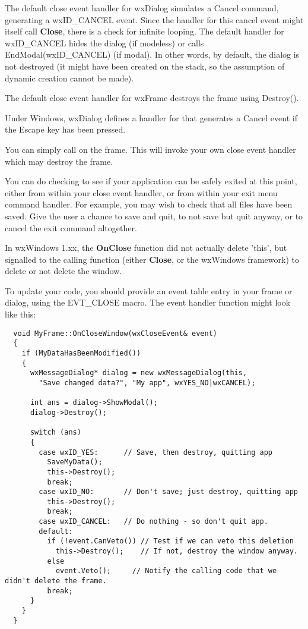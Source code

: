 
The default close event handler for wxDialog simulates a Cancel command,
generating a wxID\_CANCEL event. Since the handler for this cancel event might
itself call {\bf Close}, there is a check for infinite looping. The default handler
for wxID\_CANCEL hides the dialog (if modeless) or calls EndModal(wxID\_CANCEL) (if modal).
In other words, by default, the dialog is not destroyed (it might have been created
on the stack, so the assumption of dynamic creation cannot be made).

The default close event handler for wxFrame destroys the frame using Destroy().

Under Windows, wxDialog defines a handler for  that
generates a Cancel event if the Escape key has been pressed.


You can simply call  on the frame. This
will invoke your own close event handler which may destroy the frame.

You can do checking to see if your application can be safely exited at this point,
either from within your close event handler, or from within your exit menu command
handler. For example, you may wish to check that all files have been saved.
Give the user a chance to save and quit, to not save but quit anyway, or to cancel
the exit command altogether.


In wxWindows 1.xx, the {\bf OnClose} function did not actually delete 'this', but signalled
to the calling function (either {\bf Close}, or the wxWindows framework) to delete
or not delete the window.

To update your code, you should provide an event table entry in your frame or
dialog, using the EVT\_CLOSE macro. The event handler function might look like this:

{\small%
\begin{verbatim}
  void MyFrame::OnCloseWindow(wxCloseEvent& event)
  {
    if (MyDataHasBeenModified())
    {
      wxMessageDialog* dialog = new wxMessageDialog(this,
        "Save changed data?", "My app", wxYES_NO|wxCANCEL);

      int ans = dialog->ShowModal();
      dialog->Destroy();

      switch (ans)
      {
        case wxID_YES:      // Save, then destroy, quitting app
          SaveMyData();
          this->Destroy();
          break;
        case wxID_NO:       // Don't save; just destroy, quitting app
          this->Destroy();
          break;
        case wxID_CANCEL:   // Do nothing - so don't quit app.
        default:
          if (!event.CanVeto()) // Test if we can veto this deletion
            this->Destroy();    // If not, destroy the window anyway.
          else
            event.Veto();     // Notify the calling code that we didn't delete the frame.
          break;
      }
    }
  }
\end{verbatim}
}%

